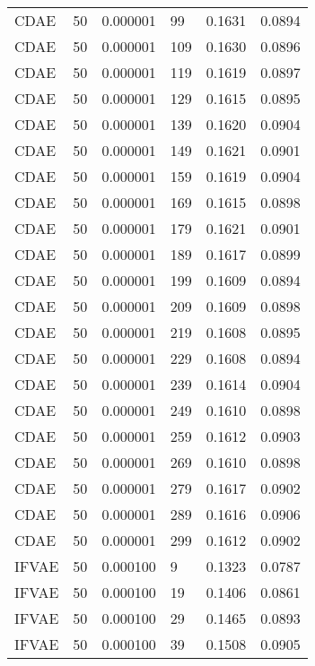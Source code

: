 \begin{tabular}{llrlrr}
    CDAE &   50 &  0.000001 &    99 &  0.1631 &       0.0894 \\
    CDAE &   50 &  0.000001 &   109 &  0.1630 &       0.0896 \\
    CDAE &   50 &  0.000001 &   119 &  0.1619 &       0.0897 \\
    CDAE &   50 &  0.000001 &   129 &  0.1615 &       0.0895 \\
    CDAE &   50 &  0.000001 &   139 &  0.1620 &       0.0904 \\
    CDAE &   50 &  0.000001 &   149 &  0.1621 &       0.0901 \\
    CDAE &   50 &  0.000001 &   159 &  0.1619 &       0.0904 \\
    CDAE &   50 &  0.000001 &   169 &  0.1615 &       0.0898 \\
    CDAE &   50 &  0.000001 &   179 &  0.1621 &       0.0901 \\
    CDAE &   50 &  0.000001 &   189 &  0.1617 &       0.0899 \\
    CDAE &   50 &  0.000001 &   199 &  0.1609 &       0.0894 \\
    CDAE &   50 &  0.000001 &   209 &  0.1609 &       0.0898 \\
    CDAE &   50 &  0.000001 &   219 &  0.1608 &       0.0895 \\
    CDAE &   50 &  0.000001 &   229 &  0.1608 &       0.0894 \\
    CDAE &   50 &  0.000001 &   239 &  0.1614 &       0.0904 \\
    CDAE &   50 &  0.000001 &   249 &  0.1610 &       0.0898 \\
    CDAE &   50 &  0.000001 &   259 &  0.1612 &       0.0903 \\
    CDAE &   50 &  0.000001 &   269 &  0.1610 &       0.0898 \\
    CDAE &   50 &  0.000001 &   279 &  0.1617 &       0.0902 \\
    CDAE &   50 &  0.000001 &   289 &  0.1616 &       0.0906 \\
    CDAE &   50 &  0.000001 &   299 &  0.1612 &       0.0902 \\
   IFVAE &   50 &  0.000100 &     9 &  0.1323 &       0.0787 \\
   IFVAE &   50 &  0.000100 &    19 &  0.1406 &       0.0861 \\
   IFVAE &   50 &  0.000100 &    29 &  0.1465 &       0.0893 \\
   IFVAE &   50 &  0.000100 &    39 &  0.1508 &       0.0905 \\

\end{tabular}
